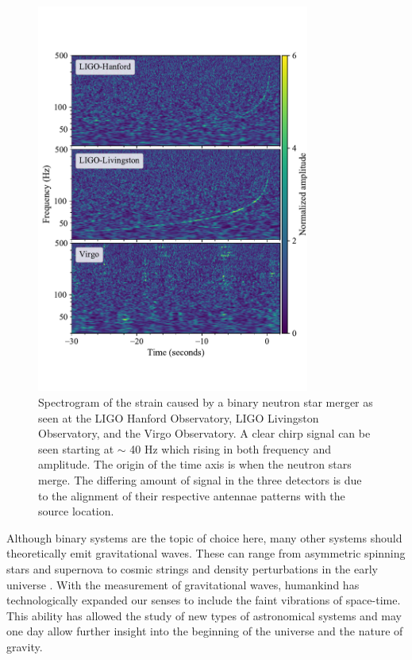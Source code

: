 \documentclass [12pt, proquest]{uwthesis}[2019]
\begin{document}
\begin{figure}
\begin{center}
\includegraphics[width=0.8\textwidth]{GW170817.pdf}
\caption[Spectrogram of the strain caused by a binary neutron star merger]{Spectrogram of the strain caused by a binary neutron star merger as seen at the LIGO Hanford Observatory, LIGO Livingston Observatory, and the Virgo Observatory. \cite{GW170817} A clear chirp signal can be seen starting at $\sim$ 40 Hz which rising in both frequency and amplitude. The origin of the time axis is when the neutron stars merge. The differing amount of signal in the three detectors is due to the alignment of their respective antennae patterns with the source location.}
\label{GW170817}
\end{center}
\end{figure}
 
 Although binary systems are the topic of choice here, many other systems should theoretically emit gravitational waves. These can range from asymmetric spinning stars \cite{contGW} and supernova \cite{SN} to cosmic strings \cite{strings} and density perturbations in the early universe \cite{inflation}. With the measurement of gravitational waves, humankind has technologically expanded our senses to include the faint vibrations of space-time. This ability has allowed the study of new types of astronomical systems and may one day allow further insight into the beginning of the universe and the nature of gravity.
\end{document}
